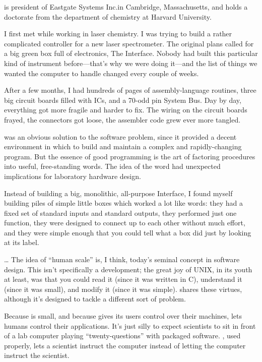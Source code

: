\begin{interview}
 is president of Eastgate Systems Inc.\@ in Cambridge, 
Massachusetts, and holds a doctorate from the department of 
chemistry at Harvard University.

\begin{tfquot}
I first met \Forth{} while working in laser chemistry.  I was trying to build a
rather complicated controller for a new laser spectrometer.  The original
plans called for a big green box full of electronics, The Interface.  Nobody 
had built this particular kind of instrument before---that's why we were 
doing it---and the list of things we wanted the computer to handle changed
every couple of weeks.

After a few months, I had hundreds of pages of assembly-language 
routines, three big circuit boards filled with ICs, and a 70-odd pin System
Bus.  Day by day, everything got more fragile and harder to fix.  The wiring 
on the circuit boards frayed, the connectors got loose, the assembler code
grew ever more tangled.

\Forth{} was an obvious solution to the software problem, since it provided
a decent environment in which to build and maintain a complex and
rapidly-changing program.  But the essence of good \Forth{} programming is the 
art of factoring procedures into useful, free-standing words.  The idea of the
\Forth{} word had unexpected implications for laboratory hardware design.

Instead of building a big, monolithic, all-purpose Interface, I found myself
building piles of simple little boxes which worked a lot like \Forth{} words:
they had a fixed set of standard inputs and standard outputs, they performed
just one function, they were designed to connect up to each other 
without much effort, and they were simple enough that you could tell what 
a box did just by looking at its label.

\dots{} The idea of ``human scale'' is, I think, today's seminal concept in 
software design.  This isn't specifically a \Forth{} development; the great joy of
UNIX, in its youth at least, was that you could read it (since it was written
in C), understand it (since it was small), and modify it (since it was simple).
\Forth{} shares these virtues, although it's designed to tackle a different 
sort of problem.

Because \Forth{} is small, and because \Forth{} gives its users control over
their machines, \Forth{} lets humans control their applications.  It's just
silly to expect scientists to sit in front of a lab computer playing
``twenty-questions'' with packaged software.  \Forth{}, used properly, lets a scientist
instruct the computer instead of letting the computer instruct the scientist.


\end{tfquot}
\end{interview}

